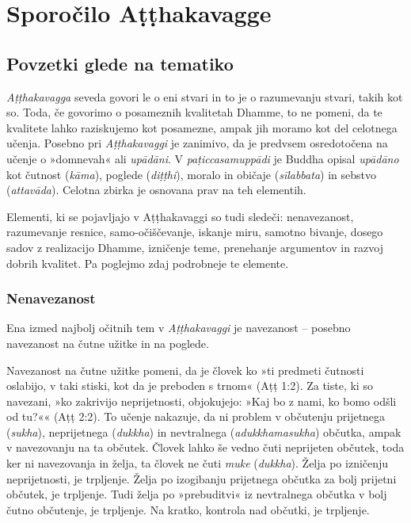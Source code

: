 \chapter{Sporočilo Aṭṭhakavagge}

\section{Povzetki glede na tematiko}

\emph{Aṭṭhakavagga} seveda govori le o eni stvari in to je o razumevanju
stvari, takih kot so. Toda, če govorimo o posameznih kvalitetah Dhamme,
to ne pomeni, da te kvalitete lahko raziskujemo kot posamezne, ampak jih
moramo kot del celotnega učenja. Posebno pri \emph{Aṭṭhakavaggi} je
zanimivo, da je predvsem osredotočena na učenje o »domnevah« ali
\emph{upādāni}. V \emph{paṭiccasamuppādi} je Buddha opisal
\emph{upādāno} kot čutnost (\emph{kāma}), poglede (\emph{diṭṭhi}),
moralo in običaje (\emph{sīlabbata}) in sebstvo (\emph{attavāda}).
Celotna zbirka je osnovana prav na teh elementih.

Elementi, ki se pojavljajo v Aṭṭhakavaggi so tudi sledeči:
nenavezanost, razumevanje resnice, samo-očiščevanje, iskanje miru,
samotno bivanje, dosego sadov z realizacijo Dhamme, izničenje teme,
prenehanje argumentov in razvoj dobrih kvalitet. Pa poglejmo zdaj
podrobneje te elemente.

\clearpage

\subsection{Nenavezanost}

Ena izmed najbolj očitnih tem v
\emph{Aṭṭhakavaggi} je navezanost -- posebno navezanost na čutne užitke
in na poglede.

Navezanost na čutne užitke pomeni, da je človek ko »ti predmeti
čutnosti oslabijo, v taki stiski, kot da je preboden s trnom« (Aṭṭ 1:2).
Za tiste, ki so navezani, »ko zakrivijo neprijetnosti, objokujejo: »Kaj
bo z nami, ko bomo odšli od tu?«« (Aṭṭ 2:2). To učenje nakazuje, da ni
problem v občutenju prijetnega (\emph{sukha}), neprijetnega
(\emph{dukkha}) in nevtralnega (\emph{adukkhamasukha}) občutka, ampak v
navezovanju na ta občutek. Človek lahko še vedno čuti neprijeten
občutek, toda ker ni navezovanja in želja, ta človek ne čuti \emph{muke}
(\emph{dukkha}). Želja po izničenju neprijetnosti, je trpljenje. Želja
po izogibanju prijetnega občutka za bolj prijetni občutek, je trpljenje.
Tudi želja po »prebuditvi« iz nevtralnega občutka v bolj čutno
občutenje, je trpljenje. Na kratko, kontrola nad občutki, je trpljenje.

